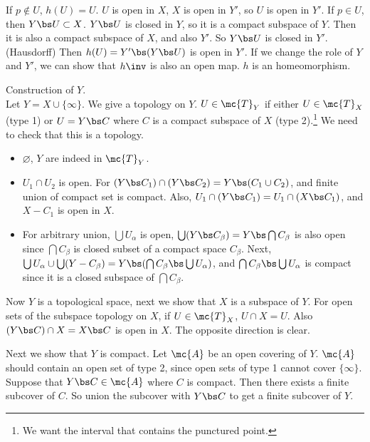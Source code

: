 If \(p \notin U\), \(h(U) = U\). \(U\) is open in \(X\), \(X\) is open in \(Y'\), so \(U\) is open in \(Y'\). If \(p \in U\), then \(Y \bs U \subset X\). \(Y \bs U\) is closed in \(Y\), so it is a compact subspace of \(Y\). Then it is also a compact subspace of \(X\), and also \(Y'\). So \(Y \bs U\) is closed in \(Y'\). (Hausdorff) Then \(h(U) = Y' \bs (Y \bs U)\) is open in \(Y'\). If we change the role of \(Y\) and \(Y'\), we can show that \(h\inv\) is also an open map. \(h\) is an homeomorphism.

 \note{\mimp} Construction of \(Y\). \\
Let \(Y = X \cup \{\infty\}\). We give a topology on \(Y\). \(U \in \mc{T}_Y\) if either \(U \in \mc{T}_X\) (type 1) or \(U = Y \bs C\) where \(C\) is a compact subspace of \(X\) (type 2).\footnote{We want the interval that contains the punctured point.} We need to check that this is a topology.
\begin{itemize}
    \item \(\varnothing\), \(Y\) are indeed in \(\mc{T}_Y\).
    \item \(U_1\cap U_2\) is open. For \((Y \bs C_1) \cap (Y \bs C_2) = Y \bs (C_1 \cup C_2)\), and finite union of compact set is compact. Also, \(U_1 \cap (Y \bs C_1) = U_1 \cap (X \bs C_1)\), and \(X - C_1\) is open in \(X\).
    \item For arbitrary union, \(\bigcup U_\alpha\) is open, \(\bigcup (Y \bs C_\beta) = Y \bs \bigcap C_\beta\) is also open since \(\bigcap C_\beta\) is closed subset of a compact space \(C_\beta\). Next, \(\bigcup U_\alpha \cup \bigcup (Y - C_\beta) = Y \bs (\bigcap C_\beta \bs \bigcup U_\alpha)\), and \(\bigcap C_\beta \bs \bigcup U_\alpha\) is compact since it is a closed subspace of \(\bigcap C_\beta\).
\end{itemize}

Now \(Y\) is a topological space, next we show that \(X\) is a subspace of \(Y\). For open sets of the subspace topology on \(X\), if \(U \in \mc{T}_X\), \(U \cap X = U\). Also \((Y \bs C) \cap X = X \bs C\) is open in \(X\). The opposite direction is clear.

Next we show that \(Y\) is compact. Let \(\mc{A}\) be an open covering of \(Y\). \(\mc{A}\) should contain an open set of type 2, since open sets of type 1 cannot cover \(\{\infty\}\). Suppose that \(Y \bs C \in \mc{A}\) where \(C\) is compact. Then there exists a finite subcover of \(C\). So union the subcover with \(Y \bs C\) to get a finite subcover of \(Y\).

